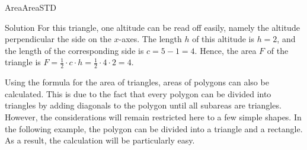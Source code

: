 \begin{MXContent}{Area}{Area}{STD}
\begin{MExercise}
\begin{center}
\end{center}

\begin{MHint}{Solution}
For this triangle, one altitude can be read off easily, namely the altitude perpendicular  
the side on the $x$-axes. The length $h$ of this altitude is $h = 2$,
and the length of the corresponding side is $c = 5 - 1 = 4$. Hence, the area $F$ of the 
triangle is 
$F = \frac{1}{2} \cdot c \cdot h = \frac{1}{2} \cdot 4 \cdot 2 = 4$.
\end{MHint}
\end{MExercise}

Using the formula for the area of triangles, areas of polygons can also be 
calculated. This is due to the fact that every polygon can be divided into 
triangles by adding diagonals to the polygon until all subareas are triangles. However, 
the considerations will remain restricted here to a few simple shapes. In the
following example, the polygon can be divided into a triangle and a rectangle. 
As a result, the calculation will be particularly easy. 


\end{MXContent}
